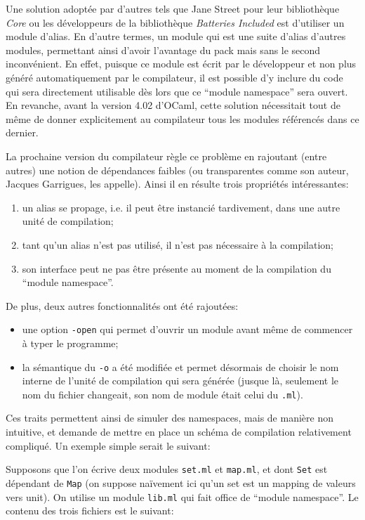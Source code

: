 \documentclass[11pt,a4paper]{report}
\begin{document}
Une solution adoptée par d'autres tels que Jane Street pour leur bibliothèque
\emph{Core} ou les développeurs de la bibliothèque \emph{Batteries Included} est
d'utiliser un module d'alias. En d'autre termes, un module qui est une suite
d'alias d'autres modules, permettant ainsi d'avoir l'avantage du pack mais sans
le second inconvénient. En effet, puisque ce module est écrit par le développeur
et non plus généré automatiquement par le compilateur, il est possible d'y
inclure du code qui sera directement utilisable dès lors que ce ``module
namespace'' sera ouvert. En revanche, avant la version 4.02 d'OCaml, cette
solution nécessitait tout de même de donner explicitement au compilateur tous
les modules référencés dans ce dernier.

La prochaine version du compilateur règle ce problème en rajoutant (entre
autres) une notion de dépendances faibles (ou transparentes comme son auteur,
Jacques Garrigues, les appelle). Ainsi il en résulte trois propriétés
intéressantes:
\begin{enumerate}
\item un alias se propage, i.e. il peut être instancié tardivement, dans une
  autre unité de compilation;
\item tant qu'un alias n'est pas utilisé, il n'est pas nécessaire à la
  compilation; 
\item son interface peut ne pas être présente au moment de la compilation du
  ``module namespace''.
\end{enumerate}
De plus, deux autres fonctionnalités ont été rajoutées:
\begin{itemize}
\item une option \texttt{-open} qui permet d'ouvrir un module avant même de
  commencer à typer le programme;
\item la sémantique du \texttt{-o} a été modifiée et permet désormais de choisir
  le nom interne de l'unité de compilation qui sera générée (jusque là,
  seulement le nom du fichier changeait, son nom de module était celui du
  \texttt{.ml}).
\end{itemize}

Ces traits permettent ainsi de simuler des namespaces, mais de manière non
intuitive, et demande de mettre en place un schéma de compilation relativement
compliqué. Un exemple simple serait le suivant:

Supposons que l'on écrive deux modules \texttt{set.ml} et \texttt{map.ml}, et
dont \texttt{Set} est dépendant de \texttt{Map} (on suppose naïvement ici qu'un
set est un mapping de valeurs vers unit). On utilise un module \texttt{lib.ml}
qui fait office de ``module namespace''. Le contenu des trois fichiers est le
suivant:
\end{document}
